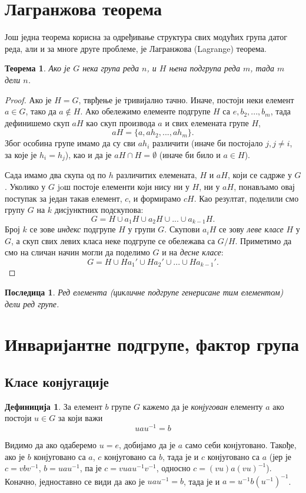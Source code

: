 \documentclass{report}
\theoremstyle{plain}
\newtheorem{thm}{Теорема}
\newtheorem*{cor}{Последица}
\theoremstyle{definition}
\newtheorem{defn}{Дефиниција}
\begin{document}
\section{Лагранжова теорема}
Још једна теорема корисна за одређивање структура свих модућих група датог реда, али и за многе друге проблеме, је Лагранжова (Lagrange) теорема.
\begin{thm}
Ако је $G$ нека група реда $n$, и $H$ њена подгрупа реда $m$, тада $m$ дели $n$.
\end{thm}
\begin{proof}
Ако је $H=G$, тврђење је тривијално тачно. Иначе, постоји неки елемент $a\in G$, тако да $a\notin H$. Ако обележимо елементе подгрупе $H$ са $e, b_2, ..., b_m$, тада дефинишемо скуп $aH$ као скуп производа $a$ и свих елемената групе $H$,
$$aH = \{a, ah_2, ..., ah_m\}.$$
Због особина групе имамо да су сви $ah_i$ различити (иначе би постојало $j, j\neq i$, за које је $h_i=h_j$), као и да је $aH\cap H = \emptyset$ (иначе би било и $a\in H$).

Сада имамо два скупа од по $h$ различитих елемената, $H$ и $aH$, који се садрже у $G$. Уколико у $G$ joш постоје елементи који нису ни у $H$, ни у $aH$, понављамо овај поступак за један такав елемент, $c$, и формирамо $cH$. Као резултат, поделили смо групу $G$ на $k$ дисјунктних подскупова:
$$G = H \cup a_1 H \cup a_2 H \cup ... \cup a_{k-1} H.$$
Број $k$ се зове \emph{индекс} подгрупе $H$ у групи $G$. Скупови $a_i H$ се зову \emph{леве класе} $H$ у $G$, а скуп свих левих класа неке подгрупе се обележава са $G/H$. Приметимо да смо на сличан начин могли да поделимо $G$ и на \emph{десне класе}:
$$G = H \cup Ha_1'  \cup Ha_2' \cup ... \cup Ha_{k-1}'.$$
\end{proof}
\begin{cor}
Ред елемента (цикличне подгрупе генерисане тим елементом) дели ред групе.
\end{cor}

\section{Инваријантне подгрупе, фактор група}
\subsection{Класе конјугације}
\begin{defn}
За елемент $b$ групе $G$ кажемо да је \emph{конјугован} елементу $a$ ако постоји $u\in G$ за који важи
$$u a u^{-1} = b$$
\end{defn}
Видимо да ако одаберемо $u = e$, добијамо да је $a$ само себи конјуговано. Такође, ако је $b$ конјуговано са $a$, $c$ конјуговано са $b$, тада је и $c$ конјуговано са $a$ (јер је $c = vbv^{-1}$, $b = uau^{-1}$, па је $c = vuau^{-1}v^{-1}$, односно $c = (vu)a(vu)^{-1}$). Коначно, једноставно се види да ако је $u a u^{-1} = b$, тада је и $a = u^{-1} b (u^{-1})^{-1}$.
\end{document}
